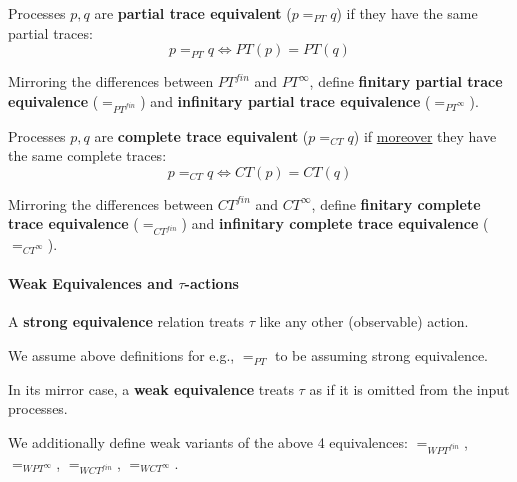\documentclass[99-notes-packed.tex]{subfiles}
\begin{document}
\begin{definition}[$=_{PT}$]
    Processes $p, q$ are \textbf{partial trace equivalent} ($p =_{PT} q$) if they have the same partial traces: 
    \begin{equation*}
        p =_{PT} q \iff PT(p) = PT(q)
    \end{equation*}

    Mirroring the differences between ${PT}^{fin}$ and ${PT}^{\infty}$, define \textbf{finitary partial trace equivalence} ($=_{{PT}^{fin}}$) and \textbf{infinitary partial trace equivalence} ($=_{{PT}^{\infty}}$).
\end{definition}

\begin{definition}[$=_{CT}$]
    Processes $p, q$ are \textbf{complete trace equivalent} ($p =_{CT} q$) if \underline{moreover} they have the same complete traces: 
    \begin{equation*}
        p =_{CT} q \iff CT(p) = CT(q)
    \end{equation*}

    Mirroring the differences between ${CT}^{fin}$ and ${CT}^{\infty}$, define \textbf{finitary complete trace equivalence} ($=_{{CT}^{fin}}$) and \textbf{infinitary complete trace equivalence} ($=_{{CT}^{\infty}}$).
\end{definition}

\paragraph*{Weak Equivalences and $\tau$-actions}
\begin{definition}
    A \textbf{strong equivalence} relation treats $\tau$ like any other (observable) action. 

    We assume above definitions for e.g., $=_{PT}$ to be assuming strong equivalence. 
\end{definition}

\begin{definition}
    In its mirror case, a \textbf{weak equivalence} treats $\tau$ as if it is omitted from the input processes. 

    We additionally define weak variants of the above 4 equivalences: $=_{{WPT}^{fin}}$, $=_{{WPT}^{\infty}}$, $=_{{WCT}^{fin}}$, $=_{{WCT}^{\infty}}$. 
\end{definition}
\end{document}
